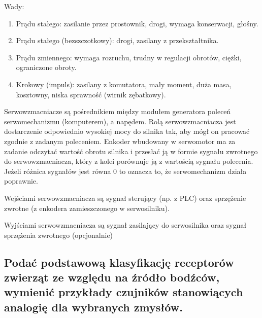Wady:
\begin{enumerate}
    \item Prądu stałego: zasilanie przez prostownik, drogi, wymaga konserwacji, głośny.
    \item Prądu stałego (bezszczotkowy): drogi, zasilany z przekształtnika.
    \item Prądu zmiennego: wymaga rozruchu, trudny w regulacji obrotów, ciężki, ograniczone obroty.
    \item Krokowy (impuls): zasilany z komutatora, mały moment, duża masa, kosztowny, niska sprawność (wirnik zębatkowy).
\end{enumerate}

Serwowzmacniacze są pośrednikiem między modułem generatora poleceń serwomechanizmu (komputerem), a napędem. Rolą serwowzmacniacza jest dostarczenie odpowiednio wysokiej mocy do silnika tak, aby mógł on pracować zgodnie z zadanym poleceniem. Enkoder wbudowany w serwomotor ma za zadanie odczytać wartość obrotu silnika i przesłać ją w formie sygnału zwrotnego do serwowzmacniacza, który z kolei porównuje ją z wartością sygnału polecenia. Jeżeli różnica sygnałów jest równa 0 to oznacza to, że serwomechanizm działa poprawnie.

Wejściami serwowzmacniacza są sygnał sterujący (np. z PLC) oraz sprzężenie zwrotne (z enkodera zamieszczonego w serwosilniku).

Wyjściami serwowzmacniacza są sygnał zasilający do serwosilnika oraz sygnał sprzężenia zwrotnego (opcjonalnie)


\subsection{Podać podstawową klasyfikację receptorów zwierząt ze względu na źródło bodźców, wymienić przykłady czujników stanowiących analogię dla wybranych zmysłów.}

